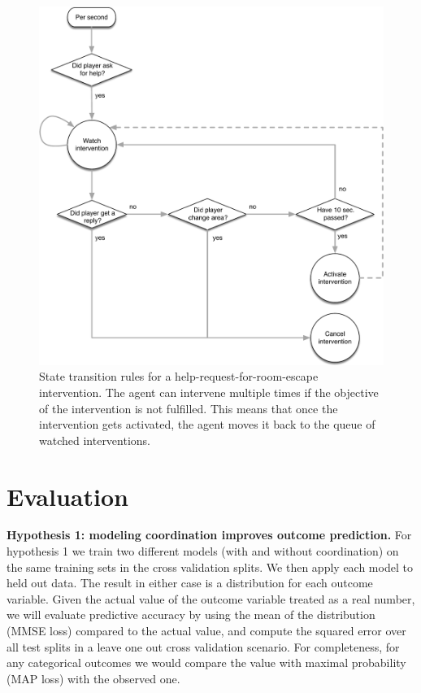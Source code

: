 %
\begin{figure}
    \centering
    \includegraphics[width=\textwidth]{images/help_request_reply_intervention_flow_chart.pdf}
    \caption{%
        State transition rules for a help-request-for-room-escape intervention.
        The agent can intervene multiple times if the objective of the
        intervention is not fulfilled. This means that once the intervention
        gets activated, the agent moves it back to the queue of watched
        interventions.
    }
    \label{fig:help_request_reply_intervention_flow_chart}
\end{figure}
%

\section{Evaluation}

\textbf{Hypothesis 1: modeling coordination improves outcome prediction.}  For
hypothesis 1 we train two different models (with and without coordination) on
the same training sets in the cross validation splits. We then apply each model
to held out data. The result in either case is a distribution for each outcome
variable. Given the actual value of the outcome variable treated as a real
number, we will evaluate predictive accuracy by using the mean of the
distribution (MMSE loss) compared to the actual value, and compute the squared
error over all test splits in a leave one out cross validation scenario. For
completeness, for any categorical outcomes we would compare the value with
maximal probability (MAP loss) with the observed one. 

